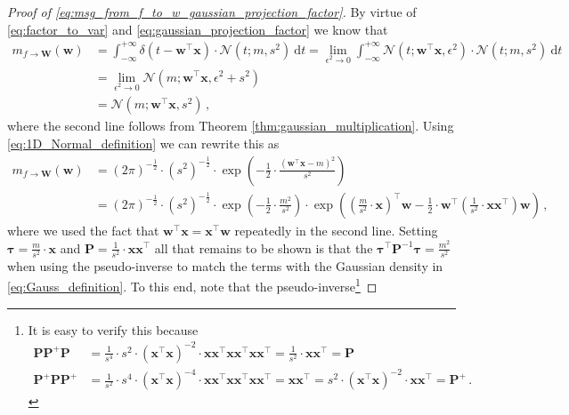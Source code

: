 \documentclass[a4paper]{article}
\newcommand{\Normal}[3]{{\mathcal N} \left({#1};{#2},{#3}\right)}
\newcommand{\bs}[1]{{\boldsymbol{#1}}}
\newcommand{\dirac}[1]{{\delta \left( {#1} \right)}}
\newcommand{\intd}[1]{\ \mathrm{d}{#1}}
\newcommand{\transpose}[1]{{#1}^\top}
\theoremstyle{definition}
\begin{document}
\begin{proof}[Proof of \eqref{eq:msg_from_f_to_w_gaussian_projection_factor}]
    By virtue of \eqref{eq:factor_to_var} and \eqref{eq:gaussian_projection_factor} we know that
    \begin{align*}
        m_{f \to \bs{W}}(\bs{w}) & = \int_{-\infty}^{+\infty} \dirac{t - \transpose{\bs{w}}\bs{x}} \cdot \Normal{t}{m}{s^2} \intd{t} 
        = \lim_{\epsilon^2 \to 0} \int_{-\infty}^{+\infty} \Normal{t}{ \transpose{\bs{w}}\bs{x}}{\epsilon^2} \cdot \Normal{t}{m}{s^2} \intd{t} \\
        & = \lim_{\epsilon^2 \to 0} \Normal{m}{ \transpose{\bs{w}}\bs{x}}{\epsilon^2 + s^2} \\
        & = \Normal{m}{ \transpose{\bs{w}}\bs{x}}{s^2} \,,
    \end{align*}
    where the second line follows from Theorem \ref{thm:gaussian_multiplication}. Using \eqref{eq:1D_Normal_definition} we can rewrite this as 
    \begin{align*}
        m_{f \to \bs{W}}(\bs{w}) & = \left( 2\pi \right)^{-\frac{1}{2}} \cdot \left( s^2 \right)^{-\frac{1}{2}} \cdot \exp \left( -\frac{1}{2} \cdot \frac{\left(\transpose{\bs{w}}\bs{x} - m \right)^2}{s^2} \right) \\
        & = \left( 2\pi \right)^{-\frac{1}{2}} \cdot \left( s^2 \right)^{-\frac{1}{2}} \cdot \exp \left( -\frac{1}{2} \cdot \frac{m^2}{s^2} \right) \cdot \exp \left( \transpose{\left( \frac{m}{s^2} \cdot \bs{x}\right)} \bs{w} -\frac{1}{2} \cdot \transpose{\bs{w}} \left( \frac{1}{s^2} \cdot \bs{x}\transpose{\bs{x}} \right) \bs{w} \right) \,,
    \end{align*}
    where we used the fact that $\transpose{\bs{w}}\bs{x} = \transpose{\bs{x}}\bs{w}$ repeatedly in the second line. Setting $\bs{\tau} = \frac{m}{s^2} \cdot \bs{x}$ and $\bs{P} = \frac{1}{s^2} \cdot \bs{x}\transpose{\bs{x}}$ all that remains to be shown is that the $\transpose{\bs{\tau}}\bs{P}^{-1}\bs{\tau} = \frac{m^2}{s^2}$ when using the pseudo-inverse to match the terms with the Gaussian density in \eqref{eq:Gauss_definition}. To this end, note that the pseudo-inverse\footnote{It is easy to verify this because 
    \begin{align*}
        \bs{P}\bs{P}^+\bs{P} & = \frac{1}{s^4} \cdot s^2 \cdot (\transpose{\bs{x}}\bs{x})^{-2} \cdot \bs{x}\transpose{\bs{x}}\bs{x}\transpose{\bs{x}}\bs{x}\transpose{\bs{x}} = \frac{1}{s^2} \cdot \bs{x}\transpose{\bs{x}} = \bs{P} \\
        \bs{P}^+\bs{P}\bs{P}^+ & = \frac{1}{s^2} \cdot s^4 \cdot (\transpose{\bs{x}}\bs{x})^{-4} \cdot \bs{x}\transpose{\bs{x}}\bs{x}\transpose{\bs{x}}\bs{x}\transpose{\bs{x}} = \bs{x}\transpose{\bs{x}} = s^2 \cdot (\transpose{\bs{x}}\bs{x})^{-2} \cdot \bs{x}\transpose{\bs{x}} = \bs{P}^+ \,.

\end{align*}}
\end{proof}
\end{document}
